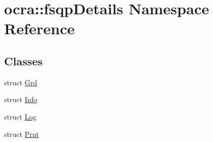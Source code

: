 \hypertarget{namespaceocra_1_1fsqpDetails}{}\section{ocra\+:\+:fsqp\+Details Namespace Reference}
\label{namespaceocra_1_1fsqpDetails}
\subsection*{Classes}
\begin{DoxyCompactItemize}
\item 
struct \hyperlink{structocra_1_1fsqpDetails_1_1Grd}{Grd}
\item 
struct \hyperlink{structocra_1_1fsqpDetails_1_1Info}{Info}
\item 
struct \hyperlink{structocra_1_1fsqpDetails_1_1Log}{Log}
\item 
struct \hyperlink{structocra_1_1fsqpDetails_1_1Prnt}{Prnt}
\end{DoxyCompactItemize}

